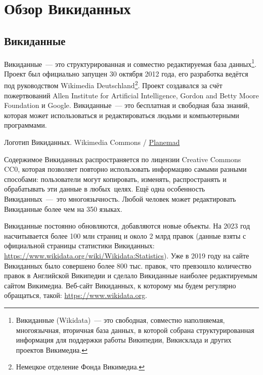 \chapter{Обзор Викиданных}
\label{ch:ReviewAboutWD}

\section{Викиданные}

Викиданные~--- это структурированная и совместно редактируемая база данных\footnote[][-15pt]{Викиданные (Wikidata)~--- это свободная, совместно наполняемая, многоязычная, вторичная база данных, в которой собрана структурированная информация для поддержки работы Википедии, Викисклада и других проектов Викимедиа.}. Проект был официально запущен 30 октября 2012 года, его разработка ведётся под руководством Wikimedia Deutschland\footnote[][5pt]{Немецкое отделение Фонда Викимедиа.}. Проект создавался за счёт пожертвований Allen Institute for Artificial Intelligence, Gordon and Betty Moore Foundation и Google. Викиданные~--- это бесплатная и свободная база знаний, которая может использоваться и редактироваться людьми и компьютерными программами\autocite{Vrandecic}.\begin{marginfigure}[0.0cm]
{
	\setlength{\fboxsep}{0pt}%
	\setlength{\fboxrule}{1pt}%
}
\caption[Логотип Викиданных]{Логотип Викиданных. 
Wikimedia Commons / \href{https://commons.wikimedia.org/wiki/File:Wikidata-logo-en.svg}{Planemad} 
}
\label{fig:seyu}
\end{marginfigure}

Содержимое Викиданных распространяется по лицензии Creative Commons CC0, которая позволяет повторно использовать информацию самыми разными способами: пользователи могут копировать, изменять, распространять и обрабатывать эти данные в любых целях. Ещё одна особенность Викиданных~--- это многоязычность. Любой человек может редактировать Викиданные более чем на 350 языках.

Викиданные постоянно обновляются, добавляются новые объекты. 
На 2023 год насчитывается более 100 млн страниц и около 2 млрд правок 
(данные взяты с официальной страницы статистики Викиданных: 
\href{https://www.wikidata.org/wiki/Wikidata:Statistics}{https://www.wikidata.org/wiki/Wikidata:Statistics}). 
Уже в 2019 году на сайте Викиданных было совершено более 800 тыс. правок, что превзошло количество правок в Английской Википедии и сделало Викиданные наиболее редактируемым сайтом Викимедиа. %
Веб-сайт Викиданных, к которому мы будем регулярно обращаться, такой: \href{https://www.wikidata.org}{https://www.wikidata.org}. %




